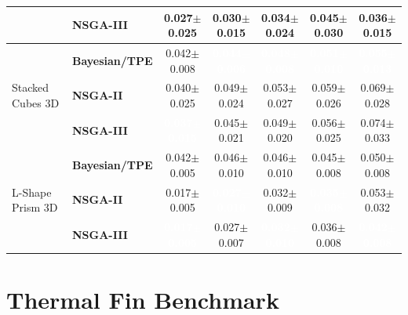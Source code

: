 \begin{table}[H]
\begin{tabular}{@{}llccccc@{}}
  & \textbf{NSGA-III} & \cellcolor{ForestGreen!25}0.027$\pm$0.025 & \cellcolor{ForestGreen!25}0.030$\pm$0.015 & \cellcolor{ForestGreen!25}0.034$\pm$0.024 & \cellcolor{ForestGreen!25}0.045$\pm$0.030 & \cellcolor{ForestGreen!25}0.036$\pm$0.015 \\
\midrule
\multirow{3}{*}{Stacked Cubes 3D}
  & \textbf{Bayesian/TPE} & \cellcolor{ForestGreen!25}0.042$\pm$0.008 & \cellcolor{ForestGreen!55}\textcolor{white}{\textbf{0.044$\pm$0.006}} & \cellcolor{ForestGreen!55}\textcolor{white}{\textbf{0.048$\pm$0.008}} & \cellcolor{ForestGreen!55}\textcolor{white}{\textbf{0.051$\pm$0.010}} & \cellcolor{ForestGreen!55}\textcolor{white}{\textbf{0.055$\pm$0.013}} \\
  & \textbf{NSGA-II} & \cellcolor{ForestGreen!25}0.040$\pm$0.025 & \cellcolor{ForestGreen!25}0.049$\pm$0.024 & \cellcolor{ForestGreen!25}0.053$\pm$0.027 & \cellcolor{ForestGreen!25}0.059$\pm$0.026 & \cellcolor{ForestGreen!25}0.069$\pm$0.028 \\
  & \textbf{NSGA-III} & \cellcolor{ForestGreen!55}\textcolor{white}{\textbf{0.037$\pm$0.015}} & \cellcolor{ForestGreen!25}0.045$\pm$0.021 & \cellcolor{ForestGreen!25}0.049$\pm$0.020 & \cellcolor{ForestGreen!25}0.056$\pm$0.025 & \cellcolor{YellowGreen!30}0.074$\pm$0.033 \\
\midrule
\multirow{3}{*}{L-Shape Prism 3D}
  & \textbf{Bayesian/TPE} & \cellcolor{ForestGreen!25}0.042$\pm$0.005 & \cellcolor{ForestGreen!25}0.046$\pm$0.010 & \cellcolor{ForestGreen!25}0.046$\pm$0.010 & \cellcolor{ForestGreen!25}0.045$\pm$0.008 & \cellcolor{ForestGreen!25}0.050$\pm$0.008 \\
  & \textbf{NSGA-II} & \cellcolor{ForestGreen!25}0.017$\pm$0.005 & \cellcolor{ForestGreen!55}\textcolor{white}{\textbf{0.027$\pm$0.010}} & \cellcolor{ForestGreen!25}0.032$\pm$0.009 & \cellcolor{ForestGreen!55}\textcolor{white}{\textbf{0.035$\pm$0.008}} & \cellcolor{ForestGreen!25}0.053$\pm$0.032 \\
  & \textbf{NSGA-III} & \cellcolor{ForestGreen!55}\textcolor{white}{\textbf{0.017$\pm$0.005}} & \cellcolor{ForestGreen!25}0.027$\pm$0.007 & \cellcolor{ForestGreen!55}\textcolor{white}{\textbf{0.032$\pm$0.010}} & \cellcolor{ForestGreen!25}0.036$\pm$0.008 & \cellcolor{ForestGreen!55}\textcolor{white}{\textbf{0.042$\pm$0.008}} \\
\bottomrule
\end{tabular}
\end{table}


\section*{Thermal Fin Benchmark}

